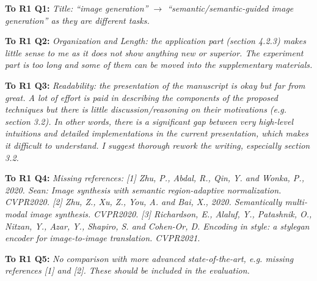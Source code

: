 \reviewersection

\noindent \textbf{To R1 Q1:} \textit{Title: ``image generation'' $\longrightarrow$ ``semantic/semantic-guided image generation'' as they are different tasks.}


\noindent \textbf{To R1 Q2:} \textit{Organization and Length: the application part (section 4.2.3) makes little sense to me as it does not show anything new or superior. The experiment part is too long and some of them can be moved into the supplementary materials.}


\noindent \textbf{To R1 Q3:} \textit{Readability: the presentation of the manuscript is okay but far from great. A lot of effort is paid in describing the components of the proposed techniques but there is little discussion/reasoning on their motivations (e.g. section 3.2). In other words, there is a significant gap between very high-level intuitions and detailed implementations in the current presentation, which makes it difficult to understand. I suggest thorough rework the writing, especially section 3.2.
}


\noindent \textbf{To R1 Q4:} \textit{Missing references:
[1] Zhu, P., Abdal, R., Qin, Y. and Wonka, P., 2020. Sean: Image synthesis with semantic region-adaptive normalization. CVPR2020.
[2] Zhu, Z., Xu, Z., You, A. and Bai, X., 2020. Semantically multi-modal image synthesis. CVPR2020.
[3] Richardson, E., Alaluf, Y., Patashnik, O., Nitzan, Y., Azar, Y., Shapiro, S. and Cohen-Or, D. Encoding in style: a stylegan encoder for image-to-image translation. CVPR2021.
}


\noindent \textbf{To R1 Q5:} \textit{No comparison with more advanced state-of-the-art, e.g. missing references [1] and [2]. These should be included in the evaluation.
}

